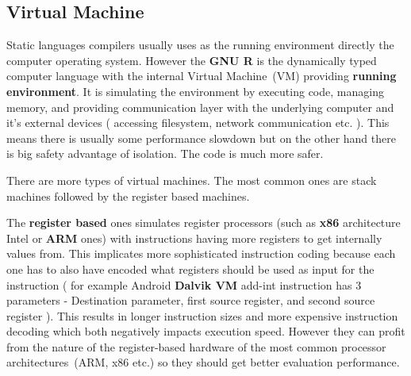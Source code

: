 \documentclass[thesis=M,english]{FITthesis}[2018/10/20]
\begin{document}


\subsection{Virtual Machine}\label{VM}

Static languages compilers usually uses as the running environment directly the computer operating system. However the \textbf{GNU R} is the dynamically typed computer language with the internal Virtual Machine~(VM) providing \textbf{running environment}. 
It is simulating the environment by executing code, managing memory, and providing communication layer with the underlying computer and it's external devices ( accessing filesystem, network communication etc. ). This means there is usually some performance slowdown but on the other hand there is big safety advantage of isolation. The code is much more safer.

There are more types of virtual machines. The most common ones are stack machines followed by the register based machines.

The \textbf{register based} ones simulates register processors (such as \textbf{x86} architecture Intel or \textbf{ARM} ones) with instructions having more registers to get internally values from. This implicates more sophisticated instruction coding because each one has to also have encoded what registers should be used as input for the instruction ( for example Android \textbf{Dalvik VM} add-int instruction has 3 parameters - Destination parameter, first source register, and second source register ). This results in longer instruction sizes and more expensive instruction decoding which both negatively impacts execution speed. However they can profit from the nature of the register-based hardware of the most common processor architectures~(ARM, x86 etc.) so they should get better evaluation performance.
\end{document}

